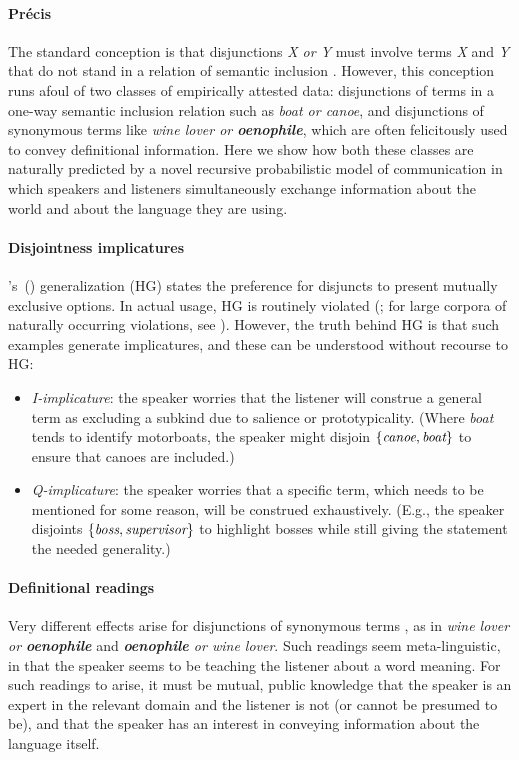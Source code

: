 \documentclass[12pt]{article}
\newcommand{\word}[1]{\emph{#1}}
\newcommand{\tech}[1]{\emph{#1}}
\newcommand{\set}[1]{\ensuremath{\left\{#1\right\}}}
\newcommand{\posscitet}[1]{\citeauthor{#1}'s~(\citeyear{#1})}
\begin{document}
\paragraph{Pr{\'e}cis}
The standard conception is that disjunctions \word{X or Y} must
involve terms \word{X} and \word{Y} that do not stand in a relation of
semantic inclusion \citep{Hurford:1974}.  However, this conception
runs afoul of two classes of empirically attested data: disjunctions
of terms in a one-way semantic inclusion relation such as \word{boat
  or canoe}, and disjunctions of synonymous terms like \word{wine
  lover or \textbf{oenophile}}, which are often felicitously used to
convey definitional information.  Here we show how both these classes
are naturally predicted by a novel recursive
probabilistic model of communication in which speakers and listeners
simultaneously exchange information about the world and about the
language they are using.

\paragraph{Disjointness implicatures}
\posscitet{Hurford:1974} generalization (HG) states the preference for
disjuncts to present mutually exclusive options. In actual usage, HG
is routinely violated (\citealt{Rohdenburg:1985}; for large corpora of
naturally occurring violations, see
\citealt{Potts13MICH,Chemla-HurfordCounts}).  However, the truth
behind HG is that such examples generate implicatures, and these can
be understood without recourse to HG:

\begin{itemize}
\item \tech{I-implicature}: the speaker worries that the listener will
  construe a general term as excluding a subkind due to salience or
  prototypicality. (Where \word{boat} tends to identify motorboats,
  the speaker might disjoin \set{\word{canoe}, \word{boat}} to ensure
  that canoes are included.)

\item \tech{Q-implicature}: the speaker worries that a specific term,
  which needs to be mentioned for some reason, will be construed
  exhaustively. (E.g., the speaker disjoints \set{\word{boss},
    \word{supervisor}} to highlight bosses while still giving the
  statement the needed generality.)
\end{itemize}

\paragraph{Definitional readings} Very different effects arise for
disjunctions of synonymous terms \citep{Horn89,Rohdenburg:1985}, as in
\word{wine lover or \textbf{oenophile}} and \word{\textbf{oenophile}
  or wine lover}. Such readings seem meta-linguistic, in that the
speaker seems to be teaching the listener about a word meaning. For
such readings to arise, it must be mutual, public knowledge that the
speaker is an expert in the relevant domain and the listener is not
(or cannot be presumed to be), and that the speaker has an interest in
conveying information about the language itself.
\end{document}
